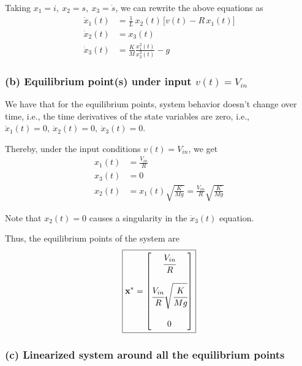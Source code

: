 Taking \( x_1 = i, \ x_2 = s, \ x_3 = \dot s \), we can rewrite the above equations as
\[
    \boxed{
        \begin{aligned}
            \dot x_1(t) & = \frac{1}{L}\, x_2(t)\, \big[ v(t) - R\, x_1(t) \big] \\
            \dot x_2(t) & = x_3(t)                                               \\
            \dot x_3(t) & = \frac{K}{M} \frac{x_1^2(t)}{x_2^2(t)} - g
        \end{aligned}
    }
\]

\subsubsection*{(b) Equilibrium point(s) under input \(v(t)=V_{in}\)}

We have that for the equilibrium points, system behavior doesn't change over time, i.e., the time derivatives of the state variables are zero, i.e., \( \dot x_1(t) = 0, \ \dot x_2(t) = 0, \ \dot x_3(t) = 0 \).

Thereby, under the input conditions \( v(t)=V_{in} \), we get
\begin{align*}
    x_1(t) & = \frac{V_{in}}{R}                                                  \\
    x_3(t) & = 0                                                                 \\
    x_2(t) & = x_1(t) \sqrt{\frac{K}{Mg}} = \frac{V_{in}}{R} \sqrt{\frac{K}{Mg}}
\end{align*}

Note that \( x_2(t) = 0 \) causes a singularity in the \( \dot x_3(t) \) equation.

Thus, the equilibrium points of the system are
\[
    \boxed{
        \mathbf{x^*} =
        \begin{bmatrix}
            \cfrac{V_{in}}{R}                      \\
            \\
            \cfrac{V_{in}}{R} \sqrt{\cfrac{K}{Mg}} \\
            \\
            0
        \end{bmatrix}
    }
\]

\subsubsection*{(c) Linearized system around all the equilibrium points}

